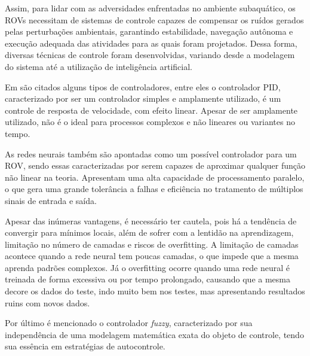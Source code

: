 \documentclass[../main.tex]{subfiles}
\begin{document}
Assim, para lidar com as adversidades enfrentadas no ambiente subaquático, os ROVs necessitam de sistemas de controle capazes de compensar os ruídos gerados pelas perturbações ambientais, garantindo estabilidade, navegação autônoma e execução adequada das atividades para as quais foram projetados. Dessa forma, diversas técnicas de controle foram desenvolvidas, variando desde a modelagem do sistema até a utilização de inteligência artificial. 

Em \cite{xu2018optimization} são citados alguns tipos de controladores, entre eles o controlador PID, caracterizado por ser um controlador simples e amplamente utilizado, é um controle de resposta de velocidade, com efeito linear. Apesar de ser amplamente utilizado, não é o ideal para processos complexos e não lineares ou variantes no tempo.

As redes neurais também são apontadas como um possível controlador para um ROV, sendo essas caracterizadas por serem capazes de aproximar qualquer função não linear na teoria. Apresentam uma alta capacidade de processamento paralelo, o que gera uma grande tolerância a falhas e eficiência no tratamento de múltiplos sinais de entrada e saída. 

Apesar das inúmeras vantagens, é necessário ter cautela, pois há a tendência de convergir para mínimos locais, além de sofrer com a lentidão na aprendizagem, limitação no número de camadas e riscos de overfitting. A limitação de camadas acontece quando a rede neural tem poucas camadas, o que impede que a mesma aprenda padrões complexos. Já o overfitting ocorre quando uma rede neural é treinada de forma excessiva ou por tempo prolongado, causando que a mesma decore os dados do teste, indo muito bem nos testes, mas apresentando resultados ruins com novos dados.

Por último é mencionado o controlador \textit{fuzzy}, caracterizado por sua independência de uma modelagem matemática exata do objeto de controle, tendo sua essência em estratégias de autocontrole.

\end{document}
